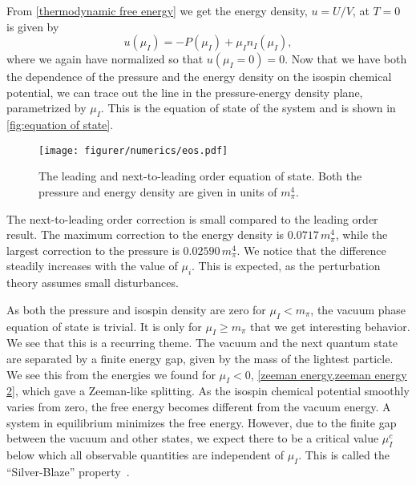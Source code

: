 From \cref{thermodynamic free energy} we get the energy density, $u = U/V$, at $T = 0$ is given by
\begin{equation}
    u(\mu_I) = -P(\mu_I) + \mu_I n_I(\mu_I),
\end{equation}
where we again have normalized so that $u(\mu_I = 0) = 0$.
Now that we have both the dependence of the pressure and the energy density on the isospin chemical potential, we can trace out the line in the pressure-energy density plane, parametrized by $\mu_I$.
This is the equation of state of the system and is shown in \autoref{fig:equation of state}.

\begin{figure}[h]
    \centering
    \vspace{-0.2cm}
    \texttt{[image: figurer/numerics/eos.pdf]}
    \caption{The leading and next-to-leading order equation of state. Both the pressure and energy density are given in units of $m_\pi^4$.}
    \label{fig:equation of state}
\end{figure}


The next-to-leading order correction is small compared to the leading order result.
The maximum correction to the energy density is $0.0717 \, m_\pi^4$, while the largest correction to the pressure is $0.02590\, m_\pi^4$.
We notice that the difference steadily increases with the value of $\mu_i$.
This is expected, as the perturbation theory assumes small disturbances.

As both the pressure and isospin density are zero for $\mu_I < m_\pi$, the vacuum phase equation of state is trivial.
It is only for $\mu_I \geq m_\pi$ that we get interesting behavior.
We see that this is a recurring theme.
The vacuum and the next quantum state are separated by a finite energy gap, given by the mass of the lightest particle.
We see this from the energies we found for $\mu_I < 0$, \cref{zeeman energy,zeeman energy 2}, which gave a Zeeman-like splitting.
As the isospin chemical potential smoothly varies from zero, the free energy becomes different from the vacuum energy.
A system in equilibrium minimizes the free energy. 
However, due to the finite gap between the vacuum and other states, we expect there to be a critical value $\mu_I^c$ below which all observable quantities are independent of $\mu_I$.
This is called the ``Silver-Blaze'' property~\cite{cohen:silver-blaze,cohen2}.


\FloatBarrier

